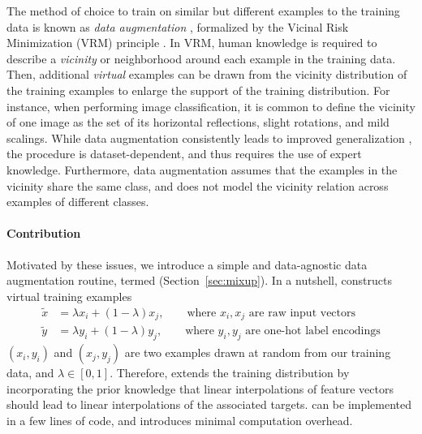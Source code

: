 The method of choice to train on similar but different examples to the training
data is known as \emph{data augmentation} \citep{simard1998transformation},
formalized by the Vicinal Risk Minimization (VRM) principle \citep{vicinal}. In
VRM, human knowledge is required to describe a \emph{vicinity} or neighborhood
around each example in the training data. Then, additional \emph{virtual}
examples can be drawn from the vicinity distribution of the training examples
to enlarge the support of the training distribution. For instance, when
performing image classification, it is common to define the vicinity of one
image as the set of its horizontal reflections, slight rotations, and mild
scalings.  While data augmentation consistently leads to improved
generalization \citep{simard1998transformation}, the procedure is
dataset-dependent, and thus requires the use of expert knowledge.  Furthermore,
data augmentation assumes that the examples in the vicinity share the same
class, and does not model the vicinity relation across examples of different
classes.

\paragraph{Contribution} Motivated by these issues, we introduce a simple and
data-agnostic data augmentation routine, termed \mixup{}
(Section~\ref{sec:mixup}).  In a nutshell, \mixup{} constructs virtual training
examples 
\begin{align*}
  \tilde{x} &= \lambda x_i + (1 - \lambda) x_j,\qquad \text{where~} x_i, x_j \text{~are~raw~input~vectors}\\
  \tilde{y} &= \lambda y_i + (1 - \lambda) y_j,\qquad \text{where~} y_i, y_j \text{~are~one-hot~label~encodings}
\end{align*}
$(x_i, y_i)$ and $(x_j, y_j)$ are two examples drawn at random from our
training data, and $\lambda \in [0,1]$. Therefore, \mixup{} extends the
training distribution by incorporating the prior knowledge that linear
interpolations of feature vectors should lead to linear interpolations of
the associated targets.  \mixup{} can be implemented in a few lines of code,
and introduces minimal computation overhead. 

